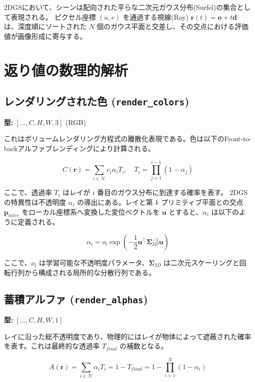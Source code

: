 2DGSにおいて、シーンは配向された平らな二次元ガウス分布(Surfel)の集合として表現される。
ピクセル座標 $(u, v)$ を通過する視線(Ray) $\bm{r}(t) = \bm{o} + t\bm{d}$ は、深度順にソートされた $N$ 個のガウス平面と交差し、その交点における評価値が画像形成に寄与する。

\section{返り値の数理的解析}

\subsection{レンダリングされた色 (\texttt{render\_colors})}
\textbf{型:} $[..., C, H, W, 3]$ (RGB)

これはボリュームレンダリング方程式の離散化表現である。色は以下のFront-to-backアルファブレンディングにより計算される。

\begin{equation}
    C(\mathbf{r}) = \sum_{i \in \mathcal{N}} c_i \alpha_i T_i, \quad T_i = \prod_{j=1}^{i-1} (1 - \alpha_j)
\end{equation}

ここで、透過率 $T_i$ はレイが $i$ 番目のガウス分布に到達する確率を表す。
2DGSの特異性は不透明度 $\alpha_i$ の導出にある。レイと第 $k$ プリミティブ平面との交点 $\bm{p}_{inter}$ をローカル座標系へ変換した変位ベクトルを $\bm{u}$ とすると、$\alpha_i$ は以下のように定義される。

\begin{equation}
    \alpha_i = o_i \exp\left( -\frac{1}{2} \bm{u}^\top \bm{\Sigma}_{2D}^{-1} \bm{u} \right)
\end{equation}

ここで、$o_i$ は学習可能な不透明度パラメータ、$\bm{\Sigma}_{2D}$ は二次元スケーリングと回転行列から構成される局所的な分散行列である。

\subsection{蓄積アルファ (\texttt{render\_alphas})}
\textbf{型:} $[..., C, H, W, 1]$

レイに沿った総不透明度であり、物理的にはレイが物体によって遮蔽された確率を表す。これは最終的な透過率 $T_{final}$ の補数となる。

\begin{equation}
    A(\mathbf{r}) = \sum_{i \in \mathcal{N}} \alpha_i T_i = 1 - T_{final} = 1 - \prod_{i=1}^{N} (1 - \alpha_i)
\end{equation}


